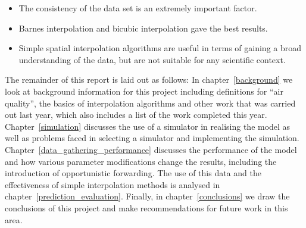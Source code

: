     \begin{itemize}
        \item The consistency of the data set is an extremely important factor.
        \item Barnes interpolation and bicubic interpolation gave the best results.
        \item Simple spatial interpolation algorithms are useful in terms of gaining a broad understanding of the data, but are not suitable for any scientific context.
    \end{itemize}

    The remainder of this report is laid out as follows: In chapter~\ref{background} we look at background information for this project including definitions for ``air quality'', the basics of interpolation algorithms and other work that was carried out last year, which also includes a list of the work completed this year. Chapter~\ref{simulation} discusses the use of a simulator in realising the model as well as problems faced in selecting a simulator and implementing the simulation. Chapter~\ref{data_gathering_performance} discusses the performance of the model and how various parameter modifications change the results, including the introduction of opportunistic forwarding. The use of this data and the effectiveness of simple interpolation methods is analysed in chapter~\ref{prediction_evaluation}. Finally, in chapter~\ref{conclusions} we draw the conclusions of this project and make recommendations for future work in this area.

